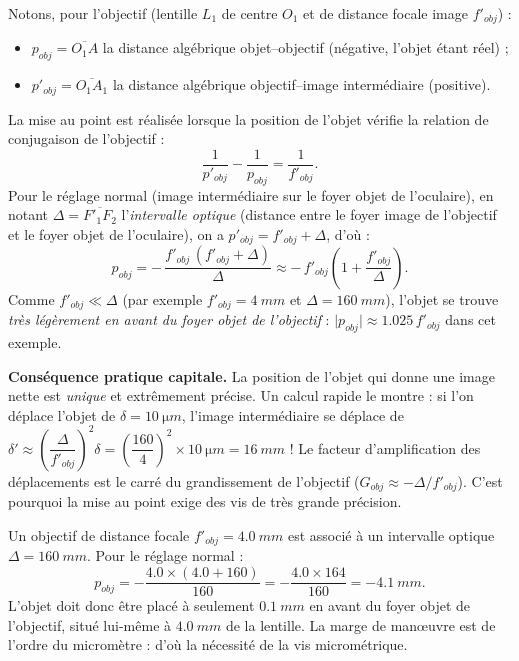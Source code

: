 \documentclass[11pt]{article}
\begin{document}
Notons, pour l'objectif (lentille $L_1$ de centre $O_1$ et de distance focale image $f'_{obj}$) :
\begin{itemize}
\item $p_{obj} = \overline{O_1A}$ la distance algébrique objet–objectif (négative, l'objet étant réel) ;
\item $p'_{obj} = \overline{O_1A_1}$ la distance algébrique objectif–image intermédiaire (positive).
\end{itemize}

\begin{propriete}
La mise au point est réalisée lorsque la position de l'objet vérifie la relation de conjugaison de l'objectif :
\[ \frac{1}{p'_{obj}} - \frac{1}{p_{obj}} = \frac{1}{f'_{obj}}. \]
Pour le réglage normal (image intermédiaire sur le foyer objet de l'oculaire), en notant $\Delta = \overline{F'_{1}F_{2}}$ l'\emph{intervalle optique} (distance entre le foyer image de l'objectif et le foyer objet de l'oculaire), on a $p'_{obj} = f'_{obj} + \Delta$, d'où :
\[ p_{obj} = -\,\frac{f'_{obj}\,(f'_{obj} + \Delta)}{\Delta} \approx -\,f'_{obj}\left(1 + \frac{f'_{obj}}{\Delta}\right). \]
Comme $f'_{obj} \ll \Delta$ (par exemple $f'_{obj} = \SI{4}{mm}$ et $\Delta = \SI{160}{mm}$), l'objet se trouve \emph{très légèrement en avant du foyer objet de l'objectif} : $\lvert p_{obj} \rvert \approx \num{1,025}\,f'_{obj}$ dans cet exemple.
\end{propriete}

\textbf{Conséquence pratique capitale.} La position de l'objet qui donne une image nette est \emph{unique} et extrêmement précise. Un calcul rapide le montre : si l'on déplace l'objet de $\delta = \SI{10}{\micro m}$, l'image intermédiaire se déplace de $\delta' \approx \left(\dfrac{\Delta}{f'_{obj}}\right)^2 \delta = \left(\dfrac{160}{4}\right)^2 \times \SI{10}{\micro m} = \SI{16}{mm}$ ! Le facteur d'amplification des déplacements est le carré du grandissement de l'objectif ($G_{obj} \approx -\Delta/f'_{obj}$). C'est pourquoi la mise au point exige des vis de très grande précision.

\begin{exemplebox}
Un objectif de distance focale $f'_{obj} = \SI{4,0}{mm}$ est associé à un intervalle optique $\Delta = \SI{160}{mm}$. Pour le réglage normal :
\[ p_{obj} = -\frac{\num{4,0}\times(\num{4,0} + 160)}{160} = -\frac{\num{4,0}\times 164}{160} = -\SI{4,1}{mm}. \]
L'objet doit donc être placé à seulement $\SI{0,1}{mm}$ en avant du foyer objet de l'objectif, situé lui-même à $\SI{4,0}{mm}$ de la lentille. La marge de manœuvre est de l'ordre du micromètre : d'où la nécessité de la vis micrométrique.
\end{exemplebox}
\end{document}
